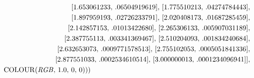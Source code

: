 \documentclass{article}
\begin{document}
\begin{maplegroup}
\begin{maplelatex}
\begin{eqnarray*}
 & & [1.653061233, \,.06504919619], \,[1.775510213, \,
.04274784443],  \\
 & & [1.897959193, \,.02726233791], \,[2.020408173, \,
.01687285459],  \\
 & & [2.142857153, \,.01013422680], \,[2.265306133, \,
.005907031189],  \\
 & & [2.387755113, \,.003341369467], \,[2.510204093, \,
.001834240684],  \\
 & & [2.632653073, \,.0009771578513], \,[2.755102053, \,
.0005051841336],  \\
 & & [2.877551033, \,.0002534610514], \,[3.000000013, \,
.0001234096941]],  \\
 & & \mathrm{COLOUR}(\mathit{RGB}, \,1.0, \,0, \,0)))
\mbox{\hspace{226pt}}
\end{eqnarray*}
\end{maplelatex}

\end{maplegroup}
\end{document}

